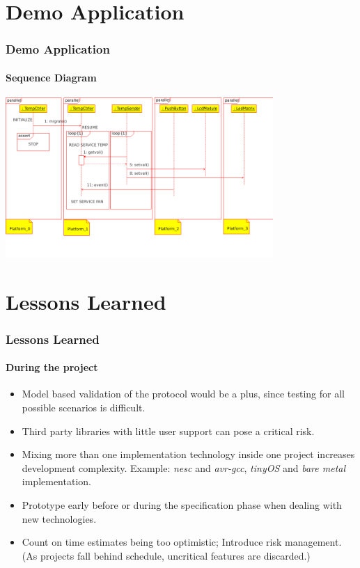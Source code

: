 \documentclass{beamer}
\theoremstyle{definition} \newtheorem{mdefinition}{Definition}
\theoremstyle{plain} \newtheorem{mtheorem}{Theorem}
\theoremstyle{plain} \newtheorem{mcorollary}{Corollary}
\theoremstyle{plain} \newtheorem{mfact}{Fact}
\begin{document}
\section{Demo Application}
\begin{frame}
  \frametitle{Demo Application}
  \framesubtitle{Sequence Diagram}
  \includegraphics[width=4in]{img/sequence-diagram-demoapp.png}
\end{frame}


\section{Lessons Learned}
\begin{frame}
  \frametitle{Lessons Learned}
  \framesubtitle{During the project}
  \begin{itemize}
        \item Model based validation of the protocol would be a plus, since testing for all possible scenarios is difficult.
        \item Third party libraries with little user support can pose a critical risk.
        \item Mixing more than one implementation technology inside one project increases development complexity. Example: \emph{nesc} and \emph{avr-gcc}, \emph{tinyOS} and \emph{bare metal} implementation.
        \item Prototype early before or during the specification phase when dealing with new technologies.
        \item Count on time estimates being too optimistic; Introduce risk management. (As projects fall behind schedule, uncritical features are discarded.)
  \end{itemize}
\end{frame}


\end{document}

